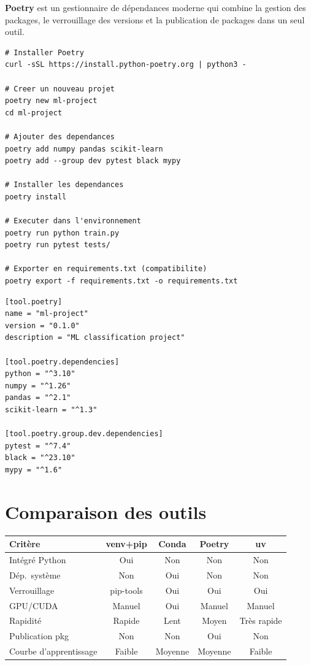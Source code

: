 \textbf{Poetry} est un gestionnaire de d\'ependances moderne
qui combine la gestion des packages, le verrouillage des versions et la
publication de packages dans un seul outil.

\begin{codeblock}[title=\textbf{Workflow Poetry}]
\begin{verbatim}
# Installer Poetry
curl -sSL https://install.python-poetry.org | python3 -

# Creer un nouveau projet
poetry new ml-project
cd ml-project

# Ajouter des dependances
poetry add numpy pandas scikit-learn
poetry add --group dev pytest black mypy

# Installer les dependances
poetry install

# Executer dans l'environnement
poetry run python train.py
poetry run pytest tests/

# Exporter en requirements.txt (compatibilite)
poetry export -f requirements.txt -o requirements.txt
\end{verbatim}
\end{codeblock}

\begin{codeblock}[title=\textbf{pyproject.toml (extrait)}]
\begin{verbatim}
[tool.poetry]
name = "ml-project"
version = "0.1.0"
description = "ML classification project"

[tool.poetry.dependencies]
python = "^3.10"
numpy = "^1.26"
pandas = "^2.1"
scikit-learn = "^1.3"

[tool.poetry.group.dev.dependencies]
pytest = "^7.4"
black = "^23.10"
mypy = "^1.6"
\end{verbatim}
\end{codeblock}

\section{Comparaison des outils}
\label{sec:env-comparison}

\begin{center}
\begin{tabular}{@{}lcccc@{}}
\toprule
\textbf{Crit\`ere} & \textbf{venv+pip} & \textbf{Conda} & \textbf{Poetry} & \textbf{uv} \\
\midrule
Int\'egr\'e Python & Oui & Non & Non & Non \\
D\'ep.\ syst\`eme & Non & Oui & Non & Non \\
Verrouillage & pip-tools & Oui & Oui & Oui \\
GPU/CUDA & Manuel & Oui & Manuel & Manuel \\
Rapidit\'e & Rapide & Lent & Moyen & Tr\`es rapide \\
Publication pkg & Non & Non & Oui & Non \\
Courbe d'apprentissage & Faible & Moyenne & Moyenne & Faible \\
\bottomrule
\end{tabular}
\end{center}


